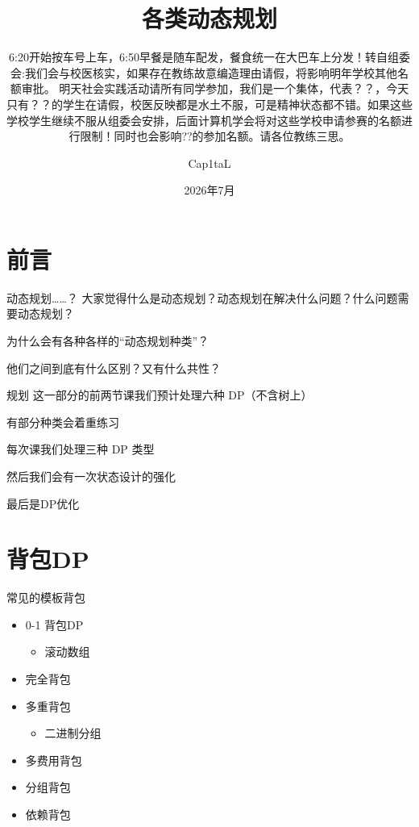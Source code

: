 ﻿\documentclass[aspectratio=169]{ctexbeamer}
\author{Cap1taL}
\title{各类动态规划}
\subtitle{6:20开始按车号上车，6:50早餐是随车配发，餐食统一在大巴车上分发！转自组委会:我们会与校医核实，如果存在教练故意编造理由请假，将影响明年学校其他名额审批。
明天社会实践活动请所有同学参加，我们是一个集体，代表？？，今天只有？？的学生在请假，校医反映都是水土不服，可是精神状态都不错。如果这些学校学生继续不服从组委会安排，后面计算机学会将对这些学校申请参赛的名额进行限制！同时也会影响??的参加名额。请各位教练三思。}
\date{2026年7月}
\begin{document}
\kaishu

\begin{frame}
    \titlepage
\end{frame}



\section{前言}

\begin{frame}{动态规划……？}
    大家觉得什么是动态规划？动态规划在解决什么问题？什么问题需要动态规划？

    为什么会有各种各样的“动态规划种类”？
    
    他们之间到底有什么区别？又有什么共性？
\end{frame}

\begin{frame}{规划}
    这一部分的前两节课我们预计处理六种 DP（不含树上）
    
    有部分种类会着重练习

    每次课我们处理三种 DP 类型

    然后我们会有一次状态设计的强化

    最后是DP优化
\end{frame}

\section{背包DP}

\begin{frame}{常见的模板背包}
    \begin{itemize}
        \item 0-1 背包DP
        \begin{itemize}
            \item 滚动数组
        \end{itemize}
        \item 完全背包
        \item 多重背包
        \begin{itemize}
            \item 二进制分组
        \end{itemize}
        \item 多费用背包
        \item 分组背包
        \item 依赖背包
    \end{itemize}
\end{frame}
\end{document}
